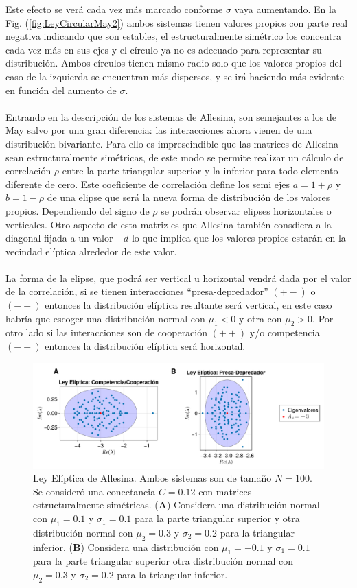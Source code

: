 Este efecto se verá cada vez más marcado conforme $\sigma$ vaya aumentando. En la Fig. (\ref{fig:LeyCircularMay2}) ambos sistemas tienen valores propios con parte real negativa indicando que son estables, el estructuralmente simétrico los concentra cada vez más en sus ejes y el círculo ya no es adecuado para representar su distribución. Ambos círculos tienen mismo radio solo que los valores propios del caso de la izquierda se encuentran más dispersos, y se irá haciendo más evidente en función del aumento de $\sigma$.\\
\\
Entrando en la descripción de los sistemas de Allesina, son semejantes a los de May salvo por una gran diferencia: las interacciones ahora vienen de una distribución bivariante. Para ello es imprescindible que las matrices de Allesina sean estructuralmente simétricas, de este modo se permite realizar un cálculo de correlación $\rho$ entre la parte triangular superior y la inferior para todo elemento diferente de cero. Este coeficiente de correlación define los semi ejes $a=1+\rho$ y $b=1-\rho$ de una elipse que será la nueva forma de distribución de los valores propios. Dependiendo del signo de $\rho$ se podrán observar elipses horizontales o verticales. Otro aspecto de esta matriz es que Allesina también consdiera a la diagonal fijada a un valor $-d$ lo que implica que los valores propios estarán en la vecindad elíptica alrededor de este valor.
\\
\\
La forma de la elipse, que podrá ser vertical u horizontal vendrá dada por el valor de la correlación, si se tienen interacciones ``presa-depredador'' $(+-)$ o $(-+)$ entonces la distribución elíptica resultante será vertical, en este caso habría que escoger una distribución normal con $\mu_1<0$ y otra con $\mu_2>0$. Por otro lado si las interacciones son de cooperación $(++)$ y/o competencia $(--)$ entonces la distribución elíptica será horizontal.
\begin{figure}[h!]
	\centering
	\includegraphics[scale=0.2]{../Imagenes/LeyElipticaAllesina}
	\caption{Ley Elíptica de Allesina. Ambos sistemas son de tamaño $N=100$. Se consideró una conectancia $C=0.12$ con matrices estructuralmente simétricas. (\textbf{A}) Considera una distribución normal con $\mu_1=0.1$ y $\sigma_1 = 0.1$ para la parte triangular superior y otra distribución normal con $\mu_2=0.3$ y $\sigma_2 = 0.2$ para la triangular inferior. (\textbf{B}) Considera una distribución con $\mu_1=-0.1$ y $\sigma_1=0.1$ para la parte triangular superior otra distribución normal con $\mu_2=0.3$ y $\sigma_2=0.2$ para la triangular inferior. }
	\label{fig:LeyElipticaAllesina}
\end{figure}

